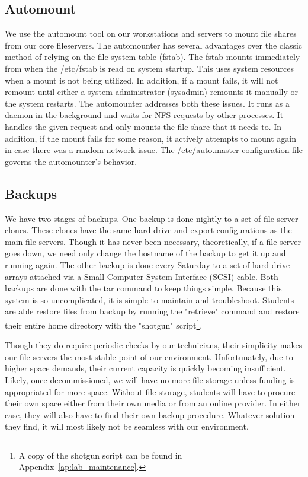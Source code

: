 \subsection{Automount}
We use the automount tool on our workstations and servers to mount file shares from our core fileservers.  The automounter has several advantages over the classic method of relying on the file system table (fstab).  The fstab mounts immediately from when the /etc/fstab is read on system startup.  This uses system resources when a mount is not being utilized.  In addition, if a mount fails, it will not remount until either a system administrator (sysadmin) remounts it manually or the system restarts.  The automounter addresses both these issues.  It runs as a daemon in the background and waits for NFS requests by other processes.  It handles the given request and only mounts the file share that it needs to.  In addition, if the mount fails for some reason, it actively attempts to mount again in case there was a random network issue.  The /etc/auto.master configuration file governs the automounter's behavior.

\subsection{Backups}
We have two stages of backups.  One backup is done nightly to a set of file server clones.  These clones have the same hard drive and export configurations as the main file servers.  Though it has never been necessary, theoretically, if a file server goes down, we need only change the hostname of the backup to get it up and running again.  The other backup is done every Saturday to a set of hard drive arrays attached via a Small Computer System Interface (SCSI) cable.  Both backups are done with the tar command to keep things simple.  Because this system is so uncomplicated, it is simple to maintain and troubleshoot.  Students are able restore files from backup by running the "retrieve" command and restore their entire home directory with the "shotgun" script\footnote{A copy of the shotgun script can be found in Appendix~\ref{ap:lab_maintenance}.}.

Though they do require periodic checks by our technicians, their simplicity makes our file servers the most stable point of our environment.  Unfortunately, due to higher space demands, their current capacity is quickly becoming insufficient.  Likely, once decommissioned, we will have no more file storage unless funding is appropriated for more space.  Without file storage, students will have to procure their own space either from their own media or from an online provider.  In either case, they will also have to find their own backup procedure.  Whatever solution they find, it will most likely not be seamless with our environment. 

